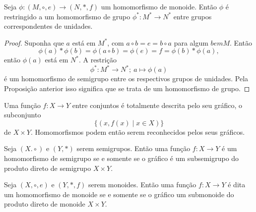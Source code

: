         \begin{theorem}
            Seja $\phi:(M,\circ,e)\to (N,*,f)$ um homomorfismo de monoide. Então $\phi$ é restringido a um homomorfismo de grupo $\phi^{*}:M^* \to N^*$ entre grupos correspondentes de unidades.
            \begin{proof}
               Suponha que $a$ está em $M^*$, com $a\circ b = e = b\circ a$ para algum $b em M$. Então
               $$\phi(a)* \phi (b) = \phi(a \circ b) = \phi(e) = f = \phi(b) * \phi(a),$$
               então $\phi(a)$ está em $N^*$. A restrição $$\phi^{*}:M^{*}\to N^{*};\ a\mapsto \phi(a)$$
               é um homomorfismo de semigrupo entre os respectivos grupos de unidades. Pela Proposição anterior isso significa que se trata de um homomorfismo de grupo.
            \end{proof}
         \end{theorem}
         Uma função $f:X\to Y$ entre conjuntos é totalmente descrita pelo seu gráfico, o subconjunto
         $$\{(x,f(x)\mid x \in X)\}$$ de $X\times Y$. Homomorfismos podem então serem reconhecidos pelos seus gráficos.

         \begin{stat}
            Seja $(X.\circ)$ e $(Y,*)$ serem semigrupos. Então uma função $f: X\to Y$ é um homomorfismo de semigrupo se e somente se o gráfico é um subsemigrupo do produto direto de semigrupo $X\times Y$.
         \end{stat}
         \begin{corollary}
            Seja $(X,\circ, e)$ e $(Y,*,f)$ serem monoides. Então uma função $f: X \to Y$ é dita um homomorfismo de monoide se e somente se o gráfico um submonoide do produto direto de monoide $X\times Y$.
         \end{corollary}

